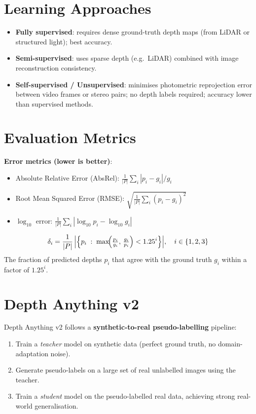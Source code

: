 \documentclass[12pt,a4paper]{report}
\begin{document}
\section{Learning Approaches}

\begin{itemize}[itemsep=2pt]
    \item \textbf{Fully supervised}: requires dense ground-truth depth maps
          (from LiDAR or structured light); best accuracy.
    \item \textbf{Semi-supervised}: uses sparse depth (e.g.\ LiDAR) combined
          with image reconstruction consistency.
    \item \textbf{Self-supervised / Unsupervised}: minimises photometric
          reprojection error between video frames or stereo pairs; no depth
          labels required; accuracy lower than supervised methods.
\end{itemize}

\section{Evaluation Metrics}

\textbf{Error metrics (lower is better)}:
\begin{itemize}[itemsep=1pt]
    \item Absolute Relative Error (AbsRel):
          $\frac{1}{|P|}\sum_i |p_i-g_i|/g_i$
    \item Root Mean Squared Error (RMSE):
          $\sqrt{\frac{1}{|P|}\sum_i(p_i-g_i)^2}$
    \item $\log_{10}$ error: $\frac{1}{|P|}\sum_i|\log_{10}p_i-\log_{10}g_i|$
\end{itemize}

\begin{formulabox}
\[
    \delta_i = \frac{1}{|P|}\,\Bigl|\Bigl\{p_i \;:\;
    \max\!\Bigl(\tfrac{p_i}{g_i},\,\tfrac{g_i}{p_i}\Bigr)
    < 1.25^i \Bigr\}\Bigr|, \quad i \in \{1,2,3\}
\]
The fraction of predicted depths $p_i$ that agree with the ground truth $g_i$
within a factor of $1.25^i$.
\end{formulabox}

\section{Depth Anything v2}

Depth Anything v2 follows a \textbf{synthetic-to-real pseudo-labelling}
pipeline:
\begin{enumerate}[itemsep=1pt]
    \item Train a \emph{teacher} model on synthetic data (perfect ground truth,
          no domain-adaptation noise).
    \item Generate pseudo-labels on a large set of real unlabelled images
          using the teacher.
    \item Train a \emph{student} model on the pseudo-labelled real data,
          achieving strong real-world generalisation.
\end{enumerate}
\end{document}
